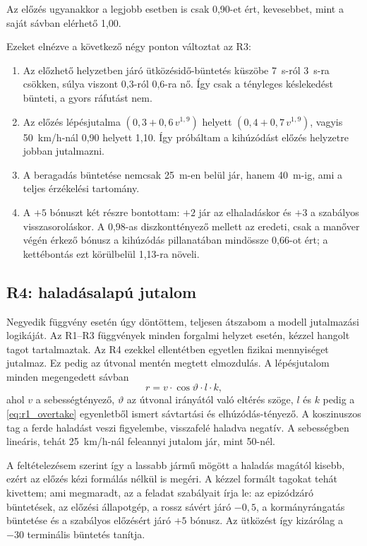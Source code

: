 \documentclass[a4paper,12pt,oneside]{article}
\begin{document}
Az előzés ugyanakkor a legjobb esetben is csak
0,90-et ért, kevesebbet, mint a saját sávban elérhető 1,00. 

Ezeket elnézve a következő négy ponton változtat az R3:

\begin{enumerate}
  \item Az előzhető helyzetben járó ütközésidő-büntetés küszöbe 7~s-ról 3~s-ra csökken,
        súlya viszont 0,3-ról 0,6-ra nő. Így csak a tényleges késlekedést bünteti, a
        gyors ráfutást nem.
  \item Az előzés lépésjutalma $(0{,}3 + 0{,}6\,v^{1,9})$ helyett
        $(0{,}4 + 0{,}7\,v^{1,9})$, vagyis 50~km/h-nál 0,90 helyett 1,10. Így próbáltam a 
        kihúzódást előzés helyzetre jobban jutalmazni.
  \item A beragadás büntetése nemcsak 25~m-en belül jár, hanem 40~m-ig, ami a teljes érzékelési tartomány.
  \item A $+5$ bónuszt két részre bontottam: $+2$ jár az elhaladáskor és $+3$ a szabályos visszasoroláskor. A 0,98-as diszkonttényező mellett az eredeti, csak a manőver
        végén érkező bónusz a kihúzódás pillanatában mindössze 0,66-ot ért; a
        kettébontás ezt körülbelül 1,13-ra növeli.
\end{enumerate}



\subsection{R4: haladásalapú jutalom}
\label{subsec:reward4}
Negyedik függvény esetén úgy döntöttem, teljesen átszabom a modell jutalmazási logikáját.
Az R1--R3 függvények minden forgalmi helyzet esetén, kézzel hangolt tagot
tartalmaztak. Az R4 ezekkel ellentétben egyetlen fizikai mennyiséget jutalmaz. Ez pedig az útvonal mentén megtett elmozdulás. A lépésjutalom minden megengedett sávban
\begin{equation}
  r = v \cdot \cos\vartheta \cdot l \cdot k,
  \label{eq:r4}
\end{equation}
ahol $v$ a sebességtényező, $\vartheta$ az útvonal irányától való eltérés szöge,
$l$ és $k$ pedig a \eqref{eq:r1_overtake} egyenletből ismert sávtartási és
elhúzódás-tényező. A koszinuszos tag a ferde haladást veszi figyelembe, visszafelé
haladva negatív. A sebességben lineáris, tehát 25~km/h-nál feleannyi jutalom jár, mint
50-nél.

A feltételezésem szerint így a lassabb jármű mögött a haladás magától kisebb, ezért az
előzés kézi formálás nélkül is megéri.
A kézzel formált tagokat tehát kivettem; ami megmaradt, az a feladat szabályait írja le: az epizódzáró büntetések, az előzési állapotgép, a rossz sávért járó $-0{,}5$, a
kormányrángatás büntetése és a szabályos előzésért járó $+5$ bónusz. Az ütközést így
kizárólag a $-30$ terminális büntetés tanítja.
\end{document}
